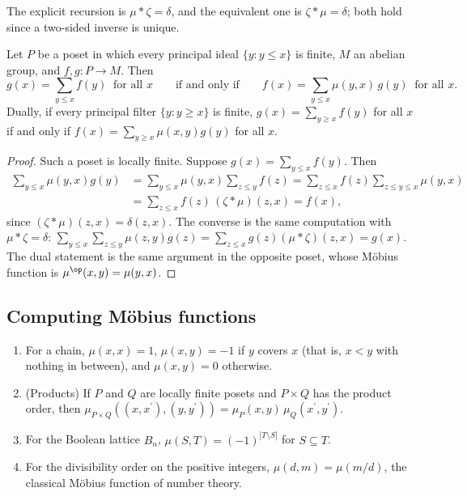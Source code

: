 The explicit recursion is $\mu \ast \zeta = \delta$, and the equivalent one is $\zeta \ast \mu = \delta$; both hold since a two-sided inverse is unique.

\begin{theorem}\label{combinatorics:theorem-mobius-inversion-posets}
Let $P$ be a poset in which every principal ideal $\{y : y \leq x\}$ is finite, $M$ an abelian group, and $f, g \colon P \to M$. Then
\[
g(x) = \sum_{y \leq x}f(y) \ \text{ for all } x \qquad\text{if and only if}\qquad f(x) = \sum_{y \leq x}\mu(y, x)\,g(y) \ \text{ for all } x .
\]
Dually, if every principal filter $\{y : y \geq x\}$ is finite, $g(x) = \sum_{y \geq x}f(y)$ for all $x$ if and only if $f(x) = \sum_{y \geq x}\mu(x, y)g(y)$ for all $x$.
\end{theorem}

\begin{proof}
Such a poset is locally finite. Suppose $g(x) = \sum_{y \leq x}f(y)$. Then
\[
\begin{aligned}
\sum_{y \leq x}\mu(y, x)g(y) &= \sum_{y \leq x}\mu(y, x)\sum_{z \leq y}f(z) = \sum_{z \leq x}f(z)\sum_{z \leq y \leq x}\mu(y, x)\\
&= \sum_{z \leq x}f(z)\,(\zeta \ast \mu)(z, x) = f(x),
\end{aligned}
\]
since $(\zeta \ast \mu)(z, x) = \delta(z, x)$. The converse is the same computation with $\mu \ast \zeta = \delta$:
$\sum_{y \leq x}\sum_{z \leq y}\mu(z, y)g(z) = \sum_{z \leq x}g(z)(\mu \ast \zeta)(z, x) = g(x)$. The dual statement is the same argument in the opposite poset, whose M\"obius function is
$\mu^{\op}(x, y) = \mu(y, x)$.
\end{proof}

\subsection{Computing M\"obius functions}\label{combinatorics:subsection-computing-mobius}

\begin{proposition}\label{combinatorics:proposition-mobius-examples}
\begin{enumerate}
\item For a chain, $\mu(x, x) = 1$, $\mu(x, y) = -1$ if $y$ covers $x$ (that is, $x < y$ with nothing in between), and $\mu(x, y) = 0$ otherwise.
\item (Products) If $P$ and $Q$ are locally finite posets and $P \times Q$ has the product order, then $\mu_{P \times Q}((x, x^{\prime}), (y, y^{\prime})) = \mu_P(x, y)\,\mu_Q(x^{\prime}, y^{\prime})$.
\item For the Boolean lattice $B_n$, $\mu(S, T) = (-1)^{|T \setminus S|}$ for $S \subseteq T$.
\item For the divisibility order on the positive integers, $\mu(d, m) = \mu(m/d)$, the classical M\"obius function of number theory.
\end{enumerate}
\end{proposition}

